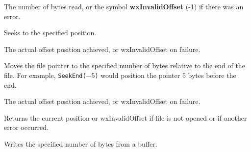 
The number of bytes read, or the symbol {\bf wxInvalidOffset} (-1) if there was an error.


\label{wxfileseek}


Seeks to the specified position.





The actual offset position achieved, or wxInvalidOffset on failure.


\label{wxfileseekend}


Moves the file pointer to the specified number of bytes relative to the end of
the file. For example, \texttt{SeekEnd($-5$)} would position the pointer $5$
bytes before the end.




The actual offset position achieved, or wxInvalidOffset on failure.


\label{wxfiletell}


Returns the current position or wxInvalidOffset if file is not opened or if another
error occurred.


\label{wxfilewrite}


Writes the specified number of bytes from a buffer.





